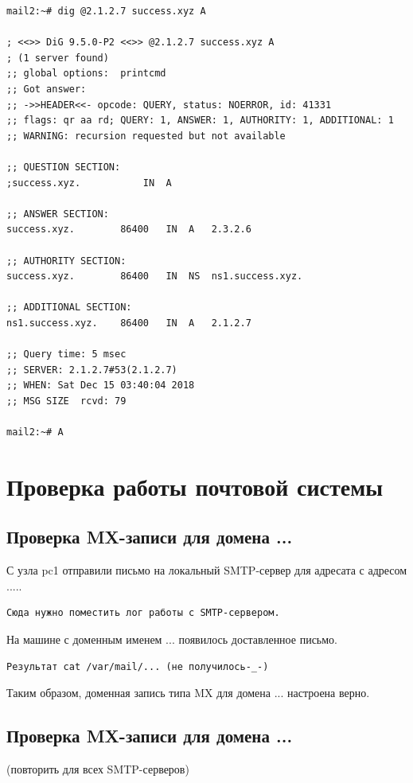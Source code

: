 \documentclass[a4paper,12pt]{article}
\begin{document}
\begin{verbatim}
mail2:~# dig @2.1.2.7 success.xyz A

; <<>> DiG 9.5.0-P2 <<>> @2.1.2.7 success.xyz A
; (1 server found)
;; global options:  printcmd
;; Got answer:
;; ->>HEADER<<- opcode: QUERY, status: NOERROR, id: 41331
;; flags: qr aa rd; QUERY: 1, ANSWER: 1, AUTHORITY: 1, ADDITIONAL: 1
;; WARNING: recursion requested but not available

;; QUESTION SECTION:
;success.xyz.			IN	A

;; ANSWER SECTION:
success.xyz.		86400	IN	A	2.3.2.6

;; AUTHORITY SECTION:
success.xyz.		86400	IN	NS	ns1.success.xyz.

;; ADDITIONAL SECTION:
ns1.success.xyz.	86400	IN	A	2.1.2.7

;; Query time: 5 msec
;; SERVER: 2.1.2.7#53(2.1.2.7)
;; WHEN: Sat Dec 15 03:40:04 2018
;; MSG SIZE  rcvd: 79

mail2:~# A

\end{verbatim}

\section{Проверка работы почтовой системы}

\subsection{Проверка MX-записи для домена ...}

С узла pc1 отправили письмо на локальный SMTP-сервер для адресата с адресом .....

\begin{verbatim}
Сюда нужно поместить лог работы с SMTP-сервером.
\end{verbatim}

На машине с доменным именем ... появилось доставленное письмо.
\begin{verbatim}
Результат cat /var/mail/... (не получилось-_-)
\end{verbatim}

Таким образом, доменная запись типа MX для домена ... настроена верно.

\subsection{Проверка MX-записи для домена ...}

(повторить для всех SMTP-серверов)
\end{document}
